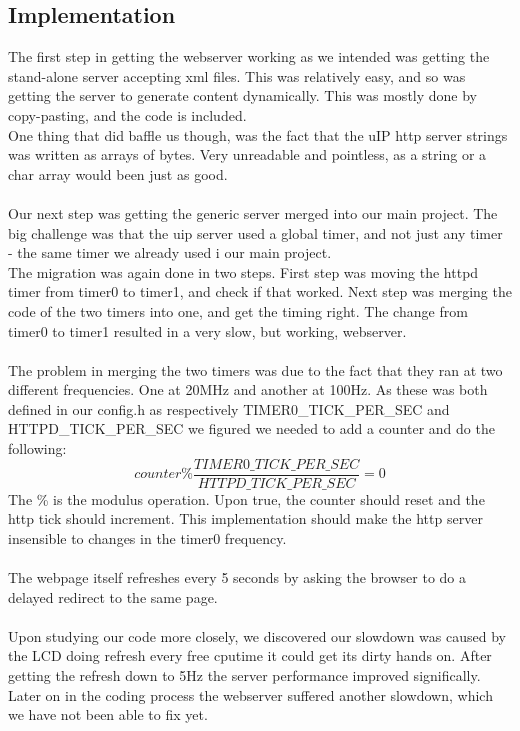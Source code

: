 {\subsection{Implementation}
The first step in getting the webserver working as we intended was getting the stand-alone server accepting xml files. This was relatively easy, and so was getting the server to generate content dynamically. This was mostly done by copy-pasting, and the code is included.\\
One thing that did baffle us though, was the fact that the uIP http server strings was written as arrays of bytes. Very unreadable and pointless, as a string or a char array would been just as good.\\\\
Our next step was getting the generic server merged into our main project. The big challenge was that the uip server used a global timer, and not just any timer - the same timer we already used i our main project.\\
The migration was again done in two steps. First step was moving the httpd timer from timer0 to timer1, and check if that worked. Next step was merging the code of the two timers into one, and get the timing right. The change from timer0 to timer1 resulted in a very slow, but working, webserver.\\\\
The problem in merging the two timers was due to the fact that they ran at two different frequencies. One at 20MHz and another at 100Hz. As these was both defined in our config.h as respectively TIMER0\_TICK\_PER\_SEC and HTTPD\_TICK\_PER\_SEC we figured we needed to add a counter and do the following:
\begin{equation}
  counter \% \frac{TIMER0\_TICK\_PER\_SEC}{HTTPD\_TICK\_PER\_SEC} = 0
\end{equation}
The \% is the modulus operation. Upon true, the counter should reset and the http tick should increment. This implementation should make the http server insensible to changes in the timer0 frequency.\\\\
The webpage itself refreshes every 5 seconds by asking the browser to do a delayed redirect to the same page.\\\\
Upon studying our code more closely, we discovered our slowdown was caused by the LCD doing refresh every free cputime it could get its dirty hands on. After getting the refresh down to 5Hz the server performance improved significally. Later on in the coding process the webserver suffered another slowdown, which we have not been able to fix yet.

}
